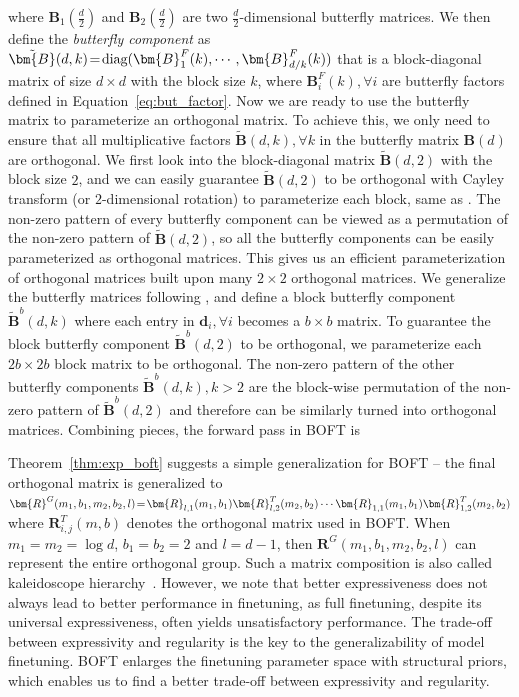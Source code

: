 where $\bm{B}_1(\frac{d}{2})$ and $\bm{B}_2(\frac{d}{2})$ are two $\frac{d}{2}$-dimensional butterfly matrices. We then define the \emph{butterfly component} as $\thickmuskip=2mu \medmuskip=2mu \tilde{\bm{B}}(d,k)=\text{diag}(\bm{B}^F_1(k),\cdots,\bm{B}^F_{d/k}(k))$ that is a block-diagonal matrix of size $d\times d$ with the block size $k$, where $\bm{B}^F_i(k),\forall i$ are butterfly factors defined in Equation~\ref{eq:but_factor}. Now we are ready to use the butterfly matrix to parameterize an orthogonal matrix. To achieve this, we only need to ensure that all multiplicative factors $\tilde{\bm{B}}(d,k),\forall k$ in the butterfly matrix $\bm{B}(d)$ are orthogonal. We first look into the block-diagonal matrix $\tilde{\bm{B}}(d,2)$ with the block size $2$, and we can easily guarantee $\tilde{\bm{B}}(d,2)$ to be orthogonal with Cayley transform (or $2$-dimensional rotation) to parameterize each block, same as \cite{liu2021orthogonal,qiu2023controlling}. The non-zero pattern of every butterfly component can be viewed as a permutation of the non-zero pattern of $\tilde{\bm{B}}(d,2)$, so all the butterfly components can be easily parameterized as orthogonal matrices. This gives us an efficient parameterization of orthogonal matrices built upon many $2\times 2$ orthogonal matrices. We generalize the butterfly matrices following \cite{chen2022pixelated}, and define a block butterfly component $\tilde{\bm{B}}^b(d,k)$ where each entry in $\bm{d}_i,\forall i$ becomes a $b\times b$ matrix. To guarantee the block butterfly component $\tilde{\bm{B}}^b(d,2)$ to be orthogonal, we parameterize each $2b\times 2b$ block matrix to be orthogonal. The non-zero pattern of the other butterfly components $\tilde{\bm{B}}^b(d,k),k>2$ are the block-wise permutation of the non-zero pattern of $\tilde{\bm{B}}^b(d,2)$ and therefore can be similarly turned into orthogonal matrices. Combining pieces, the forward pass in BOFT is

Theorem~\ref{thm:exp_boft} suggests a simple generalization for BOFT -- the final orthogonal matrix is generalized to $\thickmuskip=2mu \medmuskip=2mu \bm{R}^G(m_1,b_1,m_2,b_2,l)=\bm{R}_{l,1}(m_1,b_1)\bm{R}_{l,2}^T(m_2,b_2)\cdots\bm{R}_{1,1}(m_1,b_1)\bm{R}_{1,2}^T(m_2,b_2)$ where $\bm{R}_{i,j}^T(m,b)$ denotes the orthogonal matrix used in BOFT. When $m_1=m_2=\log d$, $b_1=b_2=2$ and $l=d-1$, then $\bm{R}^G(m_1,b_1,m_2,b_2,l)$ can represent the entire orthogonal group. Such a matrix composition is also called kaleidoscope hierarchy~\cite{dao2019kaleidoscope}. However, we note that better expressiveness does not always lead to better performance in finetuning, as full finetuning, despite its universal expressiveness, often yields unsatisfactory performance. The trade-off between expressivity and regularity is the key to the generalizability of model finetuning. BOFT enlarges the finetuning parameter space with structural priors, which enables us to find a better trade-off between expressivity and regularity.

